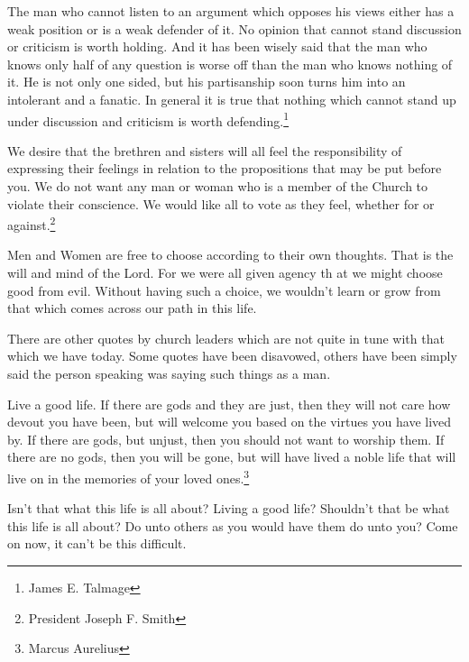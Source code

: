 \begin{displayquote}
The man who cannot listen to an argument which opposes his views either has a 
weak position or is a weak defender of it. No opinion that cannot stand 
discussion or criticism is worth holding. And it has been wisely said that 
the man who knows only half of any question is worse off than the man who 
knows nothing of it. He is not only one sided, but his partisanship soon 
turns him into an intolerant and a fanatic. In general it is true that nothing 
which cannot stand up under discussion and criticism is worth
defending.\footnote{James E. Talmage}
\end{displayquote}

\begin{displayquote}
We desire that the brethren and sisters will all feel the responsibility of 
expressing their feelings in relation to the propositions that may be put 
before you. We do not want any man or woman who is a member of the Church to 
violate their conscience. We would like all to vote as they feel, whether for 
or against.\footnote{President Joseph F. Smith}
\end{displayquote}

Men and Women are free to choose according to their own thoughts. That is the 
will and mind of the Lord. For we were all given agency th at we might choose 
good from evil. Without having such a choice, we wouldn't learn or grow from 
that which comes across our path in this life.

There are other quotes by church leaders which are not quite in tune with that 
which we have today. Some quotes have been disavowed, others have been simply 
said the person speaking was saying such things as a man.

\begin{displayquote}
Live a good life. If there are gods and they are just, then they will not care 
how devout you have been, but will welcome you based on the virtues you have 
lived by. If there are gods, but unjust, then you should not want to worship 
them. If there are no gods, then you will be gone, but will have lived a noble 
life that will live on in the memories of your loved ones.\footnote{
Marcus Aurelius}
\end{displayquote}

Isn't that what this life is all about? Living a good life? Shouldn't that be
what this life is all about? Do unto others as you would have them do unto you?
Come on now, it can't be this difficult.

